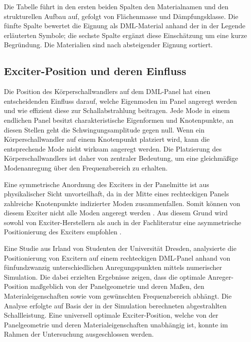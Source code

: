 Die Tabelle führt in den ersten beiden Spalten den Materialnamen und den strukturellen Aufbau auf, gefolgt von Flächenmasse und Dämpfungsklasse. Die fünfte Spalte bewertet die Eignung als DML-Material anhand der in der Legende erläuterten Symbole; die sechste Spalte ergänzt diese Einschätzung um eine kurze Begründung. Die Materialien sind nach absteigender Eignung sortiert.


\subsection{Exciter-Position und deren Einfluss}

Die Position des Körperschallwandlers auf dem DML-Panel hat einen entscheidenden Einfluss darauf, welche Eigenmoden im Panel angeregt werden und wie effizient diese zur Schallabstrahlung beitragen. Jede Mode in einem endlichen Panel besitzt charakteristische Eigenformen und Knotenpunkte, an diesen Stellen geht die Schwingungsamplitude gegen null. Wenn ein Körperschallwandler auf einem Knotenpunkt platziert wird, kann die entsprechende Mode nicht wirksam angeregt werden. Die Platzierung des Körperschallwandlers ist daher von zentraler Bedeutung, um eine gleichmäßige Modenanregung über den Frequenzbereich zu erhalten. 

Eine symmetrische Anordnung des Exciters in der Panelmitte ist aus physikalischer Sicht unvorteilhaft, da in der Mitte eines rechteckigen Panels zahlreiche Knotenpunkte indizierter Moden zusammenfallen. Somit können von diesem Exciter nicht alle Moden angeregt werden \cite{Moeser2010}. Aus diesem Grund wird sowohl von Exciter-Herstellern als auch in der Fachliteratur eine asymmetrische Positionierung des Exciters empfohlen \cite{Bai2001, DaytonAudio2024}.

Eine Studie aus Irland von Studenten der Universität Dresden, analysierte die Positionierung von Excitern auf einem rechteckigen DML-Panel anhand von fünfundzwanzig unterschiedlichen Anregungspunkten mittels numerischer Simulation. Die dabei erzielten Ergebnisse zeigen, dass die optimale Anreger-Position maßgeblich von der Panelgeometrie und deren Maßen, den Materialeigenschaften sowie vom gewünschten Frequenzbereich abhängt. Die Analyse erfolgte auf Basis der in der Simulation berechneten abgestrahlten Schallleistung. Eine universell optimale Exciter-Position, welche von der Panelgeometrie und deren Materialeigenschaften unabhängig ist, konnte im Rahmen der Untersuchung ausgeschlossen werden. \cite{Zenker2019}

 
